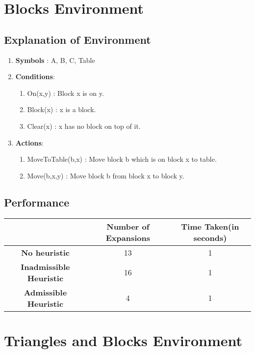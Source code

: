 \documentclass[12pt]{article}
\begin{document}
\newpage
\section{Blocks Environment}
\subsection{Explanation of Environment}
\begin{enumerate}
    \item \textbf{Symbols} : A, B, C, Table
    
    \item \textbf{Conditions}:
    \begin{enumerate}
        \item On(x,y) : Block x is on y.
        \item Block(x) : x is a block.
        \item Clear(x) : x has no block on top of it.
    \end{enumerate}
    
    \item \textbf{Actions}:
    \begin{enumerate}
        \item MoveToTable(b,x) : Move block b which is on block x to table.
        \item Move(b,x,y) : Move block b from block x to block y.
    \end{enumerate}
\end{enumerate}

\subsection{Performance}
\begin{center}
\begin{tabular}{| c | c | c |}
\hline
  & \textbf{Number of Expansions} & \textbf{Time Taken(in seconds)} \\ 
 \hline
 \textbf{No heuristic} & 13 & 1 \\  
 \hline
 \textbf{Inadmissible Heuristic} & 16 & 1 \\   
 \hline
 \textbf{Admissible Heuristic} & 4 & 1 \\
\hline
\end{tabular}
\end{center}

\newpage
\section{Triangles and Blocks Environment}
\end{document}
